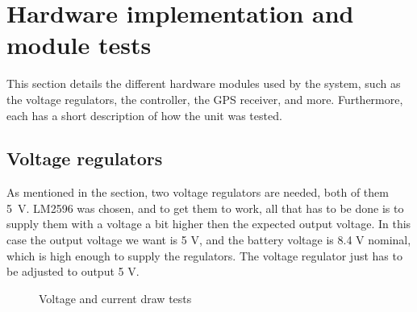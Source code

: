 \newpage
\section{Hardware implementation and module tests}
This section details the different hardware modules used by the system, such as the voltage regulators, the controller, the GPS receiver, and more. Furthermore, each has a short description of how the unit was tested.

\subsection{Voltage regulators}
As mentioned in the  section, two voltage regulators are needed, both of them 5~V.
LM2596 was chosen, and to get them to work, all that has to be done is to supply them with a voltage a bit higher then the expected output voltage. In this case the output voltage we want is 5 V, and the battery voltage is 8.4 V nominal, which is high enough to supply the regulators. The voltage regulator just has to be adjusted to output 5 V. 

\begin{figure}[H]
	\centering
	\hfill
	\hfill
	\caption{Voltage and current draw tests}
\end{figure}

